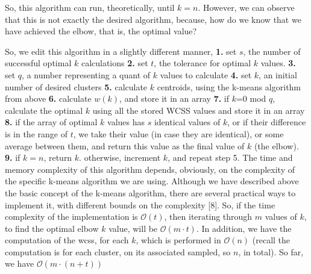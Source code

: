 \documentclass[12pt]{article}
\begin{document}
So, this algorithm can run, theoretically, until \( k=n \). \newline
However, we can observe that this is not exactly the desired algorithm, because, \newline
how do we know that we have achieved the elbow, that is, the optimal value? \newline

So, we edit this algorithm in a slightly different manner,\newline
\textbf{1.} set $s$, the number of successful optimal $k$ calculations \newline
\textbf{2.} set $t$, the tolerance for optimal $k$ values. \newline
\textbf{3.} set $q$, a number representing a quant of $k$ values to calculate \newline
\textbf{4.} set $k$, an initial number of desired clusters \newline
\textbf{5.} calculate $k$ centroids, using the k-means algorithm from above \newline
\textbf{6.} calculate $w(k)$, and store it in an array \newline
\textbf{7.} if $k$=0 mod $q$, calculate the optimal $k$ using all the stored WCSS values and store it in an array \newline
\textbf{8.} if the array of optimal $k$ values has $s$ identical values of $k$, or if their difference is in the range of $t$, we take their value (in case they are identical), or some average between them, and return this value as the final value of $k$ (the elbow). \newline
\textbf{9.} if $k=n$, return $k$. otherwise, increment $k$, and repeat step 5. \newline
\newpage
The time and memory complexity of this algorithm depends, obviously, on the complexity of the specific k-means algorithm we are using. Although we have described above the basic concept of the k-means algorithm, there are several practical ways to implement it, with different bounds on the complexity [8]. \newline
So, if the time complexity of the implementation is $\mathcal{O}(t)$, then iterating through $m$ values of $k$, to find the optimal elbow $k$ value, will be $\mathcal{O}(m \cdot t)$. In addition, we have the computation of the wcss, for each $k$, which is performed in $\mathcal{O}(n)$ (recall the computation is for each cluster, on its associated sampled, so $n$, in total). So far, we have $\mathcal{O}(m \cdot (n+t))$ \newline
\end{document}
